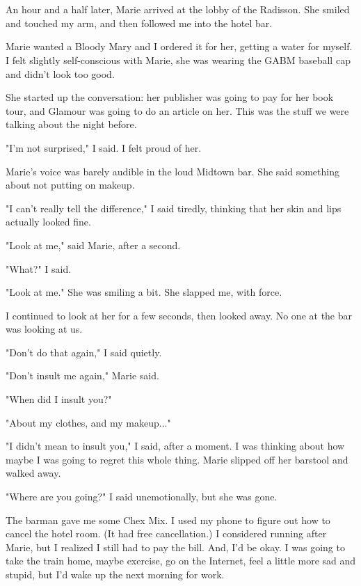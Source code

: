 \documentclass[12pt]{memoir}
\begin{document}
\section{}

An hour and a half later, Marie arrived at the lobby of the Radisson.  She
smiled and touched my arm, and then followed me into the hotel bar.  

Marie wanted a Bloody Mary and I ordered it for her, getting a water for myself.
I felt slightly self-conscious with Marie, she was wearing the GABM baseball cap
and didn't look too good.

She started up the conversation: her publisher was going to pay for her book
tour, and Glamour was going to do an article on her.  This was the stuff we were
talking about the night before.  

"I'm not surprised," I said.  I felt proud of her.

Marie's voice was barely audible in the loud Midtown bar.  She said something
about not putting on makeup.

"I can't really tell the difference," I said tiredly, thinking that her skin and
lips actually looked fine.

"Look at me," said Marie, after a second.

"What?" I said.

"Look at me."  She was smiling a bit.  She slapped me, with force.

I continued to look at her for a few seconds, then looked away.  No one at the
bar was looking at us.

"Don't do that again," I said quietly.

"Don't insult me again," Marie said.

"When did I insult you?"

"About my clothes, and my makeup..."

"I didn't mean to insult you," I said, after a moment.  I was thinking about how
maybe I was going to regret this whole thing.  Marie slipped off her barstool
and walked away.

"Where are you going?" I said unemotionally, but she was gone. 

The barman gave me some Chex Mix.  I used my phone to figure out how to cancel
the hotel room.  (It had free cancellation.)  I considered running after Marie,
but I realized I still had to pay the bill.  And, I'd be okay.  I was going to
take the train home, maybe exercise, go on the Internet, feel a little more sad
and stupid, but I'd wake up the next morning for work.
\end{document}
